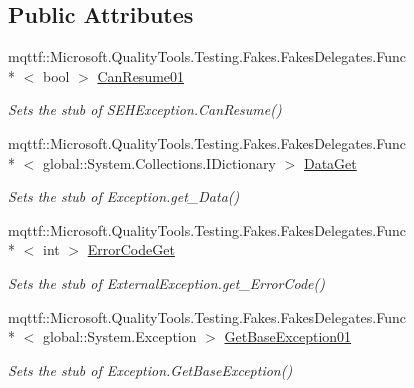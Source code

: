 \subsection*{Public Attributes}
\begin{DoxyCompactItemize}
\item 
mqttf\-::\-Microsoft.\-Quality\-Tools.\-Testing.\-Fakes.\-Fakes\-Delegates.\-Func\\*
$<$ bool $>$ \hyperlink{class_system_1_1_runtime_1_1_interop_services_1_1_fakes_1_1_stub_s_e_h_exception_a0d1f2b2a3ee86150222118c2878a7c62}{Can\-Resume01}
\begin{DoxyCompactList}\small\item\em Sets the stub of S\-E\-H\-Exception.\-Can\-Resume()\end{DoxyCompactList}\item 
mqttf\-::\-Microsoft.\-Quality\-Tools.\-Testing.\-Fakes.\-Fakes\-Delegates.\-Func\\*
$<$ global\-::\-System.\-Collections.\-I\-Dictionary $>$ \hyperlink{class_system_1_1_runtime_1_1_interop_services_1_1_fakes_1_1_stub_s_e_h_exception_ae216ee3b6002d3a7740d9c83e33d82bf}{Data\-Get}
\begin{DoxyCompactList}\small\item\em Sets the stub of Exception.\-get\-\_\-\-Data()\end{DoxyCompactList}\item 
mqttf\-::\-Microsoft.\-Quality\-Tools.\-Testing.\-Fakes.\-Fakes\-Delegates.\-Func\\*
$<$ int $>$ \hyperlink{class_system_1_1_runtime_1_1_interop_services_1_1_fakes_1_1_stub_s_e_h_exception_ad3816f80dc528237914fd4e0a7ad1464}{Error\-Code\-Get}
\begin{DoxyCompactList}\small\item\em Sets the stub of External\-Exception.\-get\-\_\-\-Error\-Code()\end{DoxyCompactList}\item 
mqttf\-::\-Microsoft.\-Quality\-Tools.\-Testing.\-Fakes.\-Fakes\-Delegates.\-Func\\*
$<$ global\-::\-System.\-Exception $>$ \hyperlink{class_system_1_1_runtime_1_1_interop_services_1_1_fakes_1_1_stub_s_e_h_exception_a0d47ff9c6fb7741ae966d702c9066b81}{Get\-Base\-Exception01}
\begin{DoxyCompactList}\small\item\em Sets the stub of Exception.\-Get\-Base\-Exception()\end{DoxyCompactList}\item 

\end{DoxyCompactItemize}
